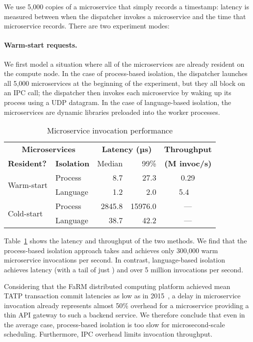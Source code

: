 We use 5,000 copies of a microservice that simply records a timestamp:\@
latency is measured between when the dispatcher invokes a microservice
and the time that microservice records.  There are two experiment modes:

\paragraph{Warm-start requests.}
We first model a situation where all of the microservices are already resident on the
compute node.  In the case of process-based isolation, the dispatcher launches all
5,000 microservices at the beginning of the experiment, but they all block on an IPC
call; the dispatcher then invokes each microservice by waking up its process using a
UDP datagram.  In the case of language-based isolation, the microservices are
dynamic libraries preloaded into the worker processes.

\begin{table}
\begin{center}
\small
\begin{tabular}{@{}llrrc@{}}
  \multicolumn{2}{c}{\textbf{Microservices}} & \multicolumn{2}{c}{\textbf{Latency (µs)}} & \textbf{Throughput} \\
  \textbf{Resident?} & \textbf{Isolation} & Median & 99\% & \textbf{(M invoc/s)} \\
\midrule
\multirow{2}{*}{Warm-start} & Process & 8.7 & 27.3 & 0.29 \\
& Language & 1.2 & 2.0 & 5.4~~ \\
\midrule
\multirow{2}{*}{Cold-start} & Process & 2845.8 & 15976.0 & \multicolumn{1}{c}{---} \\
& Language & 38.7 & 42.2 & \multicolumn{1}{c}{---} \\
\end{tabular}
\caption{Microservice invocation performance}
\label{tab:invocperf}
\end{center}
\end{table}

Table~\ref{tab:invocperf} shows the latency and throughput of the two
methods.  We find that the process-based isolation approach takes  and achieves
only 300,000 warm microservice invocations per second. In contrast, language-based
isolation achieves  latency (with a tail of just ) and over 5 million
invocations per second.

Considering that the FaRM distributed computing platform
achieved mean TATP transaction commit latencies as low as
 in 2015~\cite{Dragojevic:sosp2015}, a  delay in microservice invocation
already represents almost 50\% overhead for a microservice providing a thin API
gateway to such a backend service.  We therefore conclude that even in the average
case, process-based isolation is too slow for microsecond-scale scheduling.
Furthermore, IPC overhead limits invocation throughput.

